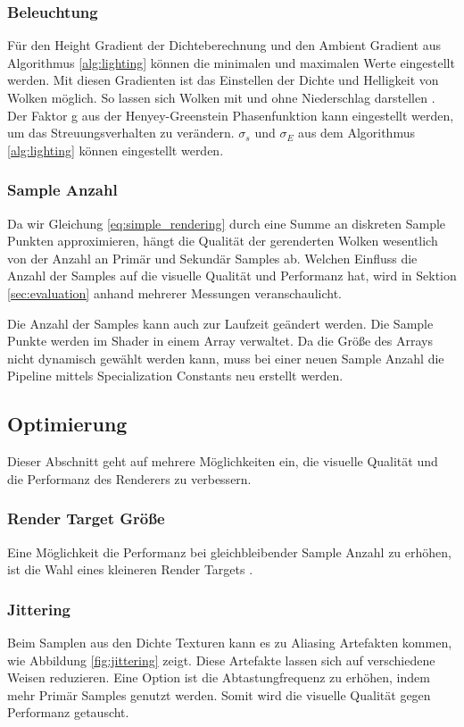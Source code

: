 \subsubsection{Beleuchtung}
Für den Height Gradient der Dichteberechnung und den Ambient Gradient aus Algorithmus \ref{alg:lighting} können die minimalen und maximalen Werte eingestellt werden. Mit diesen Gradienten ist das Einstellen der Dichte und Helligkeit von Wolken möglich. So lassen sich Wolken mit und ohne Niederschlag darstellen \cite{Högfeldt16}. Der Faktor g aus der Henyey-Greenstein Phasenfunktion kann eingestellt werden, um das Streuungsverhalten zu verändern. $ \sigma_s $ und $ \sigma_E $ aus dem Algorithmus \ref{alg:lighting} können eingestellt werden.

\subsubsection{Sample Anzahl}
Da wir Gleichung \ref{eq:simple_rendering} durch eine Summe an diskreten Sample Punkten approximieren, hängt die Qualität der gerenderten Wolken wesentlich von der Anzahl an Primär und Sekundär Samples ab. Welchen Einfluss die Anzahl der Samples auf die visuelle Qualität und Performanz hat, wird in Sektion \ref{sec:evaluation} anhand mehrerer Messungen veranschaulicht.

Die Anzahl der Samples kann auch zur Laufzeit geändert werden. Die Sample Punkte werden im Shader in einem Array verwaltet. Da die Größe des Arrays nicht dynamisch gewählt werden kann, muss bei einer neuen Sample Anzahl die Pipeline mittels Specialization Constants neu erstellt werden.

\subsection{Optimierung}
Dieser Abschnitt geht auf mehrere Möglichkeiten ein, die visuelle Qualität und die Performanz des Renderers zu verbessern.

\subsubsection{Render Target Größe}
Eine Möglichkeit die Performanz bei gleichbleibender Sample Anzahl zu erhöhen, ist die Wahl eines kleineren Render Targets \cite{Högfeldt16}.

\subsubsection{Jittering}
Beim Samplen aus den Dichte Texturen kann es zu Aliasing Artefakten kommen, wie Abbildung \ref{fig:jittering} zeigt. Diese Artefakte lassen sich auf verschiedene Weisen reduzieren. Eine Option ist die Abtastungfrequenz zu erhöhen, indem mehr Primär Samples genutzt werden. Somit wird die visuelle Qualität gegen Performanz getauscht.

